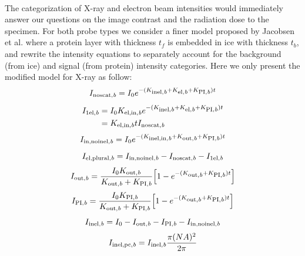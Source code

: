 \documentclass[]{article}
\newcommand\nt{\textup{\scriptsize{0}}}
\newcommand\elb{\textup{\scriptsize{el,\textit b}}}
\newcommand\inelb{\textup{\scriptsize{inel,\textit b}}}
\newcommand\elinb{\textup{\scriptsize{el,in,\textit b}}}
\newcommand\inelinb{\textup{\scriptsize{inel,in,\textit b}}}
\newcommand\outb{\textup{\scriptsize{out,\textit b}}}
\newcommand\PIb{\textup{\scriptsize{PI,\textit b}}}
\newcommand\noscatb{\textup{\scriptsize{noscat,\textit b}}}
\newcommand\selb{\textup{\scriptsize{1el,\textit b}}}
\newcommand\elplb{\textup{\scriptsize{el,plural,\textit b}}}
\newcommand\innoinelb{\textup{\scriptsize{in,noinel,\textit b}}}
\newcommand\inelpcb{\textup{\scriptsize{inel,pc,\textit b}}}
\begin{document}
\paragraph{} The categorization of X-ray and electron beam intensities would immediately answer our questions on the image contrast and the radiation dose to the specimen. For both probe types we consider a finer model proposed by Jacobsen et al. \cite{Jacobsen:1998vj} where a protein layer with thickness $t_f$ is embedded in ice with thickness $t_b$, and rewrite the intensity equations to separately account for the background (from ice) and signal (from protein) intensity categories. Here we only present the modified model for X-ray as follow:
\begin{equation}
I_{\noscatb} = I_{\nt}e^{-(K_{\inelb}+K_{\elb}+K_{\PIb})t}
\label{xb1}
\end{equation} %
\begin{equation}
\begin{aligned}
I_{\selb} &= I_{\nt}K_{\elinb}e^{-(K_{\inelb}+K_{\elb}+K_{\PIb})t} \\ &= K_{\elinb}t I_{\noscatb}
\end{aligned}
\label{xb2}
\end{equation} %
\begin{equation}
I_{\innoinelb} = I_{\nt}e^{-(K_{\inelinb}+K_{\outb}+K_{\PIb})t}
\label{xb3}
\end{equation} %
\begin{equation}
I_{\elplb} = I_{\innoinelb} - I_{\noscatb} - I_{\selb}
\label{xb4}
\end{equation} %
\begin{equation}
I_{\outb} = \frac{I_{\nt}K_{\outb}}{K_{\outb}+K_{\PIb}} \Big[1 - e^{-(K_{\outb}+K_{\PIb})t}\Big]
\label{xb5}
\end{equation} %
\begin{equation}
I_{\PIb} = \frac{I_{\nt}K_{\PIb}}{K_{\outb}+K_{\PIb}} \Big[1 - e^{-(K_{\outb}+K_{\PIb})t}\Big]
\label{xb6}
\end{equation} %
\begin{equation}
I_{\inelb} = I_{\nt} - I_{\outb} - I_{\PIb} - I_{\innoinelb}
\label{xb7}
\end{equation} %
\begin{equation}
I_{\inelpcb} = I_{\inelb} \frac{\pi(NA)^2}{2\pi}
\end{equation} %
\end{document}
